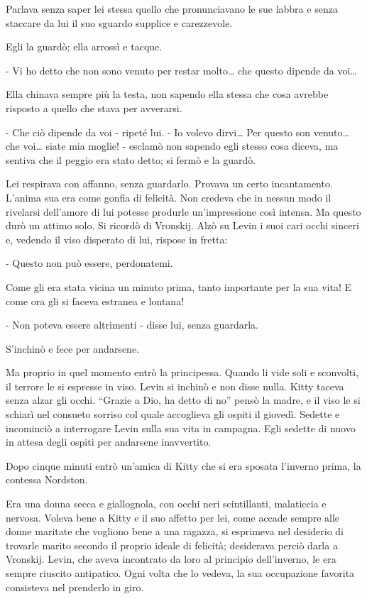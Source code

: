 Parlava senza saper lei stessa quello che pronunciavano le sue labbra e senza staccare da lui il suo sguardo supplice e carezzevole. 

Egli la guardò; ella arrossì e tacque. 

- Vi ho detto che non sono venuto per restar molto\ldots{} che questo dipende da voi\ldots{} 

Ella chinava sempre più la testa, non sapendo ella stessa che cosa avrebbe risposto a quello che stava per avverarsi. 

- Che ciò dipende da voi - ripeté lui. - Io volevo dirvi\ldots{} Per questo son venuto\ldots{} che voi\ldots{} siate mia moglie! - esclamò non sapendo egli stesso cosa diceva, ma sentiva che il peggio era stato detto; si fermò e la guardò. 

Lei respirava con affanno, senza guardarlo. Provava un certo incantamento. L'anima sua era come gonfia di felicità. Non credeva che in nessun modo il rivelarsi dell'amore di lui potesse produrle un'impressione così intensa. Ma questo durò un attimo solo. Si ricordò di Vronskij. Alzò su Levin i suoi cari occhi sinceri e, vedendo il viso disperato di lui, rispose in fretta: 

- Questo non può essere, perdonatemi. 

Come gli era stata vicina un minuto prima, tanto importante per la sua vita! E come ora gli si faceva estranea e lontana! 

- Non poteva essere altrimenti - disse lui, senza guardarla. 

S'inchinò e fece per andarsene. 

Ma proprio in quel momento entrò la principessa. Quando li vide soli e sconvolti, il terrore le si espresse in viso. Levin si inchinò e non disse nulla. Kitty taceva senza alzar gli occhi. ``Grazie a Dio, ha detto di no'' pensò la madre, e il viso le si schiarì nel consueto sorriso col quale accoglieva gli ospiti il giovedì. Sedette e incominciò a interrogare Levin sulla sua vita in campagna. Egli sedette di nuovo in attesa degli ospiti per andarsene inavvertito. 

Dopo cinque minuti entrò un'amica di Kitty che si era sposata l'inverno prima, la contessa Nordston. 

Era una donna secca e giallognola, con occhi neri scintillanti, malaticcia e nervosa. Voleva bene a Kitty e il suo affetto per lei, come accade sempre alle donne maritate che vogliono bene a una ragazza, si esprimeva nel desiderio di trovarle marito secondo il proprio ideale di felicità; desiderava perciò darla a Vronskij. Levin, che aveva incontrato da loro al principio dell'inverno, le era sempre riuscito antipatico. Ogni volta che lo vedeva, la sua occupazione favorita consisteva nel prenderlo in giro. 

